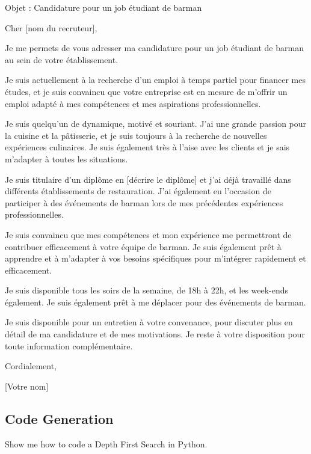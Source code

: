 \begin{completionkaobox}[frametitle=CroissantLLMChat]
Objet : Candidature pour un job étudiant de barman

Cher [nom du recruteur],

Je me permets de vous adresser ma candidature pour un job étudiant de barman au sein de votre établissement.

Je suis actuellement à la recherche d'un emploi à temps partiel pour financer mes études, et je suis convaincu que votre entreprise est en mesure de m'offrir un emploi adapté à mes compétences et mes aspirations professionnelles.

Je suis quelqu'un de dynamique, motivé et souriant. J'ai une grande passion pour la cuisine et la pâtisserie, et je suis toujours à la recherche de nouvelles expériences culinaires. Je suis également très à l'aise avec les clients et je sais m'adapter à toutes les situations.

Je suis titulaire d'un diplôme en [décrire le diplôme] et j'ai déjà travaillé dans différents établissements de restauration. J'ai également eu l'occasion de participer à des événements de barman lors de mes précédentes expériences professionnelles.

Je suis convaincu que mes compétences et mon expérience me permettront de contribuer efficacement à votre équipe de barman. Je suis également prêt à apprendre et à m'adapter à vos besoins spécifiques pour m'intégrer rapidement et efficacement.

Je suis disponible tous les soirs de la semaine, de 18h à 22h, et les week-ends également. Je suis également prêt à me déplacer pour des événements de barman.

Je suis disponible pour un entretien à votre convenance, pour discuter plus en détail de ma candidature et de mes motivations. Je reste à votre disposition pour toute information complémentaire.

Cordialement,

[Votre nom]
\end{completionkaobox}

\subsection{Code Generation}

\begin{promptkaobox}[frametitle=Prompt]
Show me how to code a Depth First Search in Python.
\end{promptkaobox}

